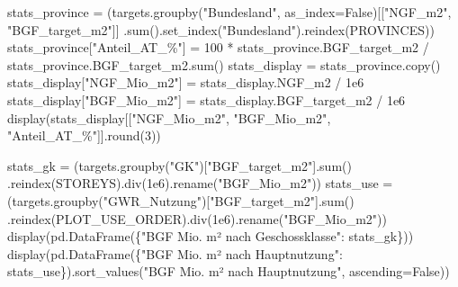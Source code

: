\documentclass[
  ngerman,
  a4paper,
  DIV=11]{scrreprt}
\newenvironment{Shaded}{\begin{snugshade}}{\end{snugshade}}
\newcommand{\BuiltInTok}[1]{\textcolor[rgb]{0.00,0.23,0.31}{#1}}
\newcommand{\DecValTok}[1]{\textcolor[rgb]{0.68,0.00,0.00}{#1}}
\newcommand{\FloatTok}[1]{\textcolor[rgb]{0.68,0.00,0.00}{#1}}
\newcommand{\NormalTok}[1]{\textcolor[rgb]{0.00,0.23,0.31}{#1}}
\newcommand{\OperatorTok}[1]{\textcolor[rgb]{0.37,0.37,0.37}{#1}}
\newcommand{\StringTok}[1]{\textcolor[rgb]{0.13,0.47,0.30}{#1}}
\newcommand{\VariableTok}[1]{\textcolor[rgb]{0.07,0.07,0.07}{#1}}
\begin{document}
\begin{Shaded}
\begin{Highlighting}[]
\NormalTok{stats\_province }\OperatorTok{=}\NormalTok{ (targets.groupby(}\StringTok{"Bundesland"}\NormalTok{, as\_index}\OperatorTok{=}\VariableTok{False}\NormalTok{)[[}\StringTok{"NGF\_m2"}\NormalTok{, }\StringTok{"BGF\_target\_m2"}\NormalTok{]]}
\NormalTok{                  .}\BuiltInTok{sum}\NormalTok{().set\_index(}\StringTok{"Bundesland"}\NormalTok{).reindex(PROVINCES))}
\NormalTok{stats\_province[}\StringTok{"Anteil\_AT\_\%"}\NormalTok{] }\OperatorTok{=} \DecValTok{100} \OperatorTok{*}\NormalTok{ stats\_province.BGF\_target\_m2 }\OperatorTok{/}\NormalTok{ stats\_province.BGF\_target\_m2.}\BuiltInTok{sum}\NormalTok{()}
\NormalTok{stats\_display }\OperatorTok{=}\NormalTok{ stats\_province.copy()}
\NormalTok{stats\_display[}\StringTok{"NGF\_Mio\_m2"}\NormalTok{] }\OperatorTok{=}\NormalTok{ stats\_display.NGF\_m2 }\OperatorTok{/} \FloatTok{1e6}
\NormalTok{stats\_display[}\StringTok{"BGF\_Mio\_m2"}\NormalTok{] }\OperatorTok{=}\NormalTok{ stats\_display.BGF\_target\_m2 }\OperatorTok{/} \FloatTok{1e6}
\NormalTok{display(stats\_display[[}\StringTok{"NGF\_Mio\_m2"}\NormalTok{, }\StringTok{"BGF\_Mio\_m2"}\NormalTok{, }\StringTok{"Anteil\_AT\_\%"}\NormalTok{]].}\BuiltInTok{round}\NormalTok{(}\DecValTok{3}\NormalTok{))}

\NormalTok{stats\_gk }\OperatorTok{=}\NormalTok{ (targets.groupby(}\StringTok{"GK"}\NormalTok{)[}\StringTok{"BGF\_target\_m2"}\NormalTok{].}\BuiltInTok{sum}\NormalTok{()}
\NormalTok{            .reindex(STOREYS).div(}\FloatTok{1e6}\NormalTok{).rename(}\StringTok{"BGF\_Mio\_m2"}\NormalTok{))}
\NormalTok{stats\_use }\OperatorTok{=}\NormalTok{ (targets.groupby(}\StringTok{"GWR\_Nutzung"}\NormalTok{)[}\StringTok{"BGF\_target\_m2"}\NormalTok{].}\BuiltInTok{sum}\NormalTok{()}
\NormalTok{             .reindex(PLOT\_USE\_ORDER).div(}\FloatTok{1e6}\NormalTok{).rename(}\StringTok{"BGF\_Mio\_m2"}\NormalTok{))}
\NormalTok{display(pd.DataFrame(\{}\StringTok{"BGF Mio. m² nach Geschossklasse"}\NormalTok{: stats\_gk\}))}
\NormalTok{display(pd.DataFrame(\{}\StringTok{"BGF Mio. m² nach Hauptnutzung"}\NormalTok{: stats\_use\}).sort\_values(}\StringTok{"BGF Mio. m² nach Hauptnutzung"}\NormalTok{, ascending}\OperatorTok{=}\VariableTok{False}\NormalTok{))}
\end{Highlighting}
\end{Shaded}
\end{document}
